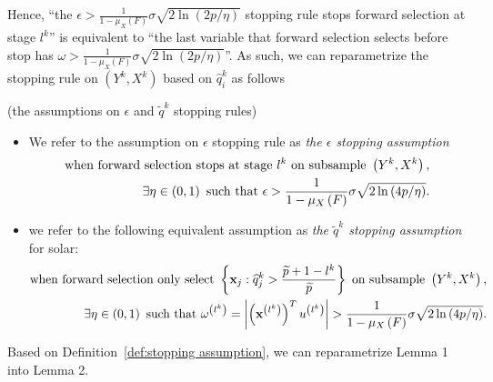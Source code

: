\documentclass[11pt,review,authoryear]{elsarticle}
\begin{document}
\begin{appendices}
\noindent
Hence, ``the $\epsilon > \frac{1}{1 - \mu_X \left( F \right)} \sigma \sqrt{ 2 \ln \left(2p / \eta \right)}$ stopping rule stops forward selection at stage $l^k$'' is equivalent to ``the last variable that forward selection selects before stop has $\omega > \frac{1}{1-\mu_{X}\left(F\right)}\sigma\sqrt{2\ln\left(2p/\eta\right)}$''. As such, we can reparametrize the stopping rule on $\left(Y^{k},X^{k}\right)$ based on $\widehat{q}_{i}^{k}$ as follows
%
\begin{definition}
  (the assumptions on $\epsilon$ and $\widetilde{q}^k$ stopping rules) \label{def:stopping assumption}
\end{definition}    

\begin{itemize}
  \item We refer to the \citet{zhang09} assumption on $\epsilon$ stopping rule as \emph{the $\epsilon$ stopping assumption}
  \begin{eqnarray}
    \mbox{when forward selection stops at stage } l^k \mbox{ on subsample } \left(Y^k, X^k\right), \\ \notag
    \exists \eta \in \left( 0, 1\right) \mbox{ such that }\epsilon>\frac{1}{1-\mu_{X}\left(F\right)}\sigma\sqrt{2\ln\left(4p/\eta\right)}.
  \end{eqnarray}
  \item we refer to the following equivalent assumption as \emph{the $\widetilde{q}^k$ stopping assumption} for solar:
  \begin{eqnarray}
    \mbox{when forward selection only select } \left\{ \mathbf{x}_j:\widehat{q}_j^k > \frac{\widetilde{p} + 1 - l^k} {\widetilde{p}} \right\} \mbox{ on subsample } \left(Y^k, X^k \right), \notag \\ 
    \exists \eta \in \left( 0, 1\right) \mbox{ such that } \omega^{\left(l^k \right)} = \left\vert \left( \mathbf{x}^{\left( l^k \right)}\right) ^T u^{\left(l^{k}\right)} \right\vert >\frac{1}{1-\mu_{X}\left(F\right)}\sigma\sqrt{2\ln\left(4p/\eta\right)}. \label{eqn:qk_stopping}
  \end{eqnarray}
\end{itemize}
\medskip

Based on Definition~\ref{def:stopping assumption}, we can reparametrize Lemma 1 into Lemma 2.


\end{appendices}
\end{document}
